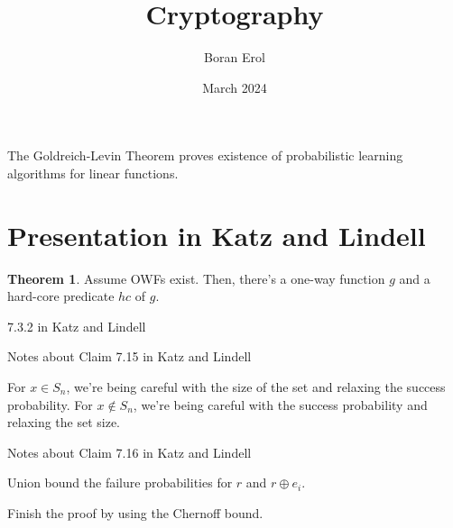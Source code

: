 \documentclass{article}
\title{Cryptography}
\date{March 2024}
\author{Boran Erol}
\theoremstyle{definition}
\newtheorem{theorem}{Theorem}[section]
\begin{document}
\maketitle

The Goldreich-Levin Theorem proves existence of probabilistic learning algorithms
for linear functions.



\newpage

\section{Presentation in Katz and Lindell}



\begin{theorem}
    Assume OWFs exist. Then, there's a one-way function $g$ and a hard-core predicate
    $hc$ of $g$.
\end{theorem}

7.3.2 in Katz and Lindell

Notes about Claim 7.15 in Katz and Lindell

For $x \in S_{n}$, we're being careful with the size of the set and relaxing the success probability.
For $x \notin S_{n}$, we're being careful with the success probability and relaxing the set size.

Notes about Claim 7.16 in Katz and Lindell

Union bound the failure probabilities for $r$ and $r \oplus e_{i}$.

Finish the proof by using the Chernoff bound.
\end{document}
